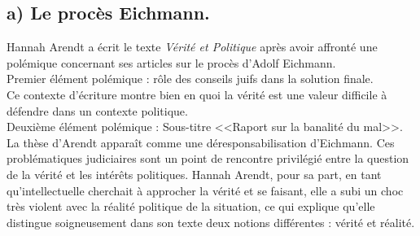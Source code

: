 \documentclass[12pt]{article}
\begin{document}
\subsection*{a) Le procès Eichmann.}
Hannah Arendt a écrit le texte \emph{Vérité et Politique} après avoir affronté une polémique concernant ses articles sur le procès d'Adolf Eichmann.\\
Premier élément polémique : rôle des conseils juifs dans la solution finale.\\
Ce contexte d'écriture montre bien en quoi la vérité est une valeur difficile à défendre dans un contexte politique.\\
Deuxième élément polémique : Sous-titre <<Raport sur la banalité du mal>>.\\
La thèse d'Arendt apparaît comme une déresponsabilisation d'Eichmann.
Ces problématiques judiciaires sont un point de rencontre privilégié entre la question de la vérité et les intérêts politiques.
Hannah Arendt, pour sa part, en tant qu'intellectuelle cherchait à approcher la vérité et se faisant, elle a subi un choc très violent avec la réalité politique de la situation, ce qui explique qu'elle distingue soigneusement dans son texte deux notions différentes : vérité et réalité.
\end{document}
